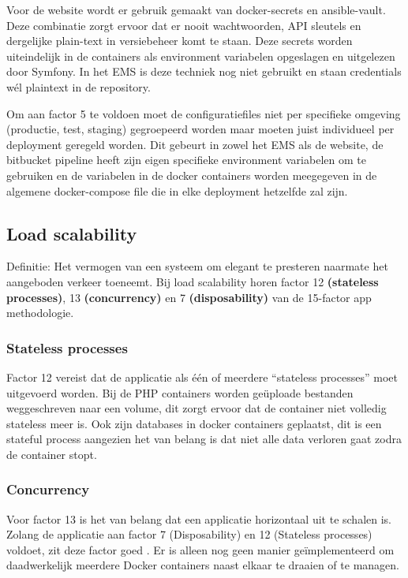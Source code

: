 Voor de website wordt er gebruik gemaakt van docker-secrets en ansible-vault. Deze combinatie zorgt ervoor dat er nooit wachtwoorden, API sleutels en dergelijke plain-text in versiebeheer komt te staan. Deze secrets worden uiteindelijk in de containers als environment variabelen opgeslagen en uitgelezen door Symfony. In het EMS is deze techniek nog niet gebruikt en staan credentials wél plaintext in de repository.

Om aan factor 5 te voldoen moet de configuratiefiles niet per specifieke omgeving (productie, test, staging) gegroepeerd worden maar moeten juist individueel per deployment geregeld worden. Dit gebeurt in zowel het EMS als de website, de bitbucket pipeline heeft zijn eigen specifieke environment variabelen om te gebruiken en de variabelen in de docker containers worden meegegeven in de algemene docker-compose file die in elke deployment hetzelfde zal zijn.

\subsection{Load scalability}
Definitie: Het vermogen van een systeem om elegant te presteren naarmate het aangeboden verkeer toeneemt. Bij load scalability horen factor 12 \textbf{(stateless processes)}, 13 \textbf{(concurrency)} en 7 \textbf{(disposability)} van de 15-factor app methodologie. 

\subsubsection{Stateless processes}
Factor 12 vereist dat de applicatie als één of meerdere \enquote{stateless processes} moet uitgevoerd worden. Bij de PHP containers worden geüploade bestanden weggeschreven naar een volume, dit zorgt ervoor dat de container niet volledig stateless meer is. Ook zijn databases in docker containers geplaatst, dit is een stateful process aangezien het van belang is dat niet alle data verloren gaat zodra de container stopt.

\subsubsection{Concurrency}
Voor factor 13 is het van belang dat een applicatie horizontaal uit te schalen is. Zolang de applicatie aan factor 7 (Disposability) en 12 (Stateless processes) voldoet, zit deze factor goed \parencite{Beyond12Factor}. Er is alleen nog geen manier geïmplementeerd om daadwerkelijk meerdere Docker containers naast elkaar te draaien of te managen.

